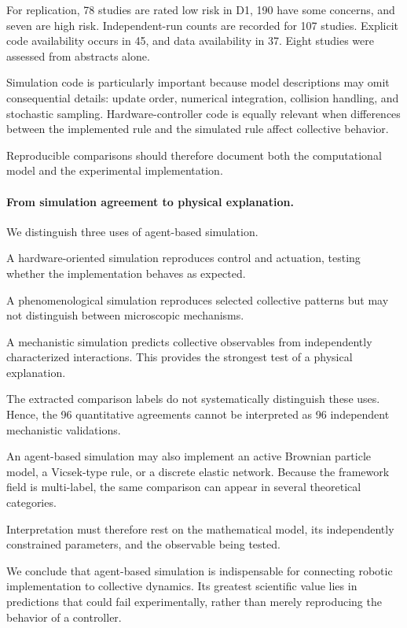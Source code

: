 For replication, 78 studies
are rated low risk in D1,
190 have some concerns,
and seven are high risk.
Independent-run counts are
recorded for 107 studies.
Explicit code availability
occurs in 45, and data
availability in 37.
Eight studies were assessed
from abstracts alone.

Simulation code is particularly
important because model descriptions
may omit consequential details:
update order, numerical integration,
collision handling, and stochastic
sampling. Hardware-controller code
is equally relevant when differences
between the implemented rule and
the simulated rule affect collective
behavior.

Reproducible comparisons should
therefore document both the
computational model and the
experimental implementation.

\paragraph*{From simulation agreement to physical explanation.}

We distinguish three uses of
agent-based simulation.

A hardware-oriented simulation
reproduces control and actuation,
testing whether the implementation
behaves as expected.

A phenomenological simulation
reproduces selected collective
patterns but may not distinguish
between microscopic mechanisms.

A mechanistic simulation predicts
collective observables from
independently characterized
interactions. This provides
the strongest test of a
physical explanation.

The extracted comparison labels
do not systematically distinguish
these uses. Hence, the 96
quantitative agreements cannot
be interpreted as 96 independent
mechanistic validations.

An agent-based simulation may also
implement an active Brownian
particle model, a Vicsek-type
rule, or a discrete elastic network.
Because the framework field
is multi-label, the same
comparison can appear in
several theoretical categories.

Interpretation must therefore
rest on the mathematical model,
its independently constrained
parameters, and the observable
being tested.

We conclude that agent-based
simulation is indispensable
for connecting robotic
implementation to collective
dynamics. Its greatest
scientific value lies in
predictions that could fail
experimentally, rather than
merely reproducing the
behavior of a controller.

